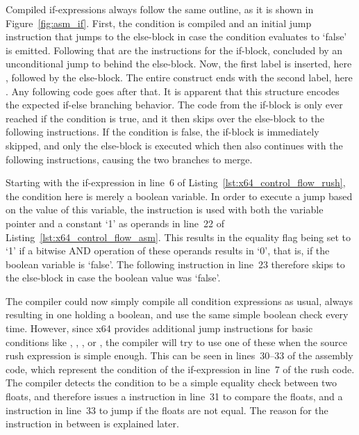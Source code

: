 Compiled if-expressions always follow the same outline, as it is shown in Figure~\ref{fig:asm_if}.
First, the condition is compiled and an initial jump instruction that jumps to the else-block in case the condition evaluates to `false' is emitted.
Following that are the instructions for the if-block, concluded by an unconditional jump to behind the else-block.
Now, the first label is inserted, here , followed by the else-block.
The entire construct ends with the second label, here .
Any following code goes after that.
It is apparent that this structure encodes the expected if-else branching behavior.
The code from the if-block is only ever reached if the condition is true, and it then skips over the else-block to the following instructions.
If the condition is false, the if-block is immediately skipped, and only the else-block is executed which then also continues with the following instructions, causing the two branches to merge.

Starting with the if-expression in line~6 of Listing~\ref{lst:x64_control_flow_rush}, the condition here is merely a boolean variable.
In order to execute a jump based on the value of this variable, the  instruction is used with both the variable pointer and a constant `1' as operands in line~22 of Listing~\ref{lst:x64_control_flow_asm}.
This results in the equality flag being set to `1' if a bitwise AND operation of these operands results in `0', that is, if the boolean variable is `false'.
The following  instruction in line~23 therefore skips to the else-block in case the boolean value was `false'.

The compiler could now simply compile all condition expressions as usual, always resulting in one  holding a boolean, and use the same simple boolean check every time.
However, since x64 provides additional jump instructions for basic conditions like \qVerb{==}, \qVerb{!=}, \qVerb{>=}, or \qVerb{<}, the compiler will try to use one of these when the source rush expression is simple enough.
This can be seen in lines~30--33 of the assembly code, which represent the condition of the if-expression in line~7 of the rush code.
The compiler detects the condition to be a simple equality check between two floats, and therefore issues a  instruction in line~31 to compare the floats, and a  instruction in line~33 to jump if the floats are not equal.
The reason for the \label{x64_ucomisd} instruction in between is explained later.

